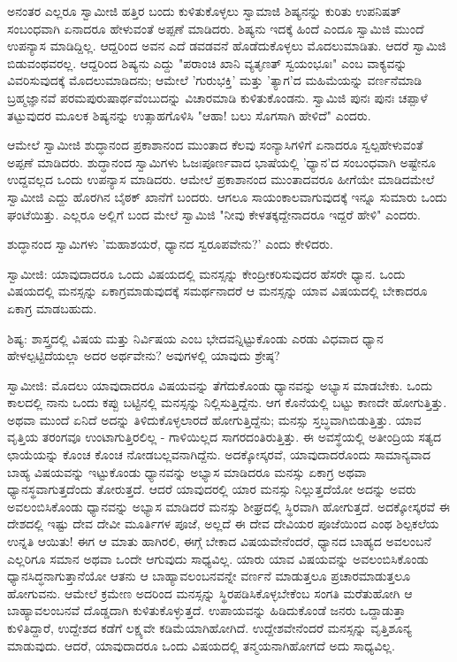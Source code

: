 ಅನಂತರ ಎಲ್ಲರೂ ಸ್ವಾಮೀಜಿ ಹತ್ತಿರ ಬಂದು ಕುಳಿತುಕೊಳ್ಳಲು ಸ್ವಾಮಾಜಿ ಶಿಷ್ಯನನ್ನು ಕುರಿತು ಉಪನಿಷತ್‌ ಸಂಬಂಧವಾಗಿ ಏನಾದರೂ ಹೇಳುವಂತೆ ಅಪ್ಪಣೆ ಮಾಡಿದರು. ಶಿಷ್ಯನು ಇದಕ್ಕೆ ಹಿಂದೆ ಎಂದೂ ಸ್ವಾಮಿಜಿ ಮುಂದೆ ಉಪನ್ಯಾಸ ಮಾಡಿದ್ದಿಲ್ಲ. ಆದ್ದರಿಂದ ಅವನ ಎದೆ ಡವಡವನೆ ಹೊಡೆದುಕೊಳ್ಳಲು ಮೊದಲುಮಾಡಿತು. ಆದರೆ ಸ್ವಾಮಿಜಿ ಬಿಡುವಂಥವರಲ್ಲ. ಆದ್ದರಿಂದ ಶಿಷ್ಯನು ಎದ್ದು "ಪರಾಂಚಿ ಖಾನಿ ವ್ಯತೃಣತ್ ಸ್ವಯಂಭೂಃ" ಎಂಬ ವಾಕ್ಯವನ್ನು ವಿವರಿಸುವುದಕ್ಕೆ ಮೊದಲುಮಾಡಿದನು; ಆಮೇಲೆ 'ಗುರುಭಕ್ತಿ' ಮತ್ತು 'ತ್ಯಾಗ'ದ ಮಹಿಮೆಯನ್ನು ವರ್ಣನೆಮಾಡಿ ಬ್ರಹ್ಮಜ್ಞಾನವೆ ಪರಮಪುರುಷಾರ್ಥವೆಂಬುದನ್ನು ವಿಚಾರಮಾಡಿ ಕುಳಿತುಕೊಂಡನು. ಸ್ವಾಮಿಜಿ ಪುನಃ ಪುನಃ ಚಪ್ಪಾಳೆ ತಟ್ಟುವುದರ ಮೂಲಕ ಶಿಷ್ಯನನ್ನು ಉತ್ಸಾಹಗೊಳಿಸಿ "ಆಹಾ! ಬಲು ಸೊಗಸಾಗಿ ಹೇಳಿದೆ" ಎಂದರು.

ಆಮೇಲೆ ಸ್ವಾಮೀಜಿ ಶುದ್ಧಾನಂದ ಪ್ರಕಾಶಾನಂದ ಮುಂತಾದ ಕೆಲವು ಸಂನ್ಯಾಸಿಗಳಿಗೆ ಏನಾದರೂ ಸ್ವಲ್ಪಹೇಳುವಂತೆ ಅಪ್ಪಣೆ ಮಾಡಿದರು. ಶುದ್ಧಾನಂದ ಸ್ವಾಮಿಗಳು ಓಜಃಪೂರ್ಣವಾದ ಭಾಷೆಯಲ್ಲಿ 'ಧ್ಯಾನ'ದ ಸಂಬಂಧವಾಗಿ ಅಷ್ಟೇನೂ ಉದ್ದವಲ್ಲದ ಒಂದು ಉಪನ್ಯಾಸ ಮಾಡಿದರು. ಆಮೇಲೆ ಪ್ರಕಾಶಾನಂದ ಮುಂತಾದವರೂ ಹೀಗೆಯೇ ಮಾಡಿದಮೇಲೆ ಸ್ವಾಮೀಜಿ ಎದ್ದು ಹೊರಗಿನ ಬೈಠಕ್ ಖಾನೆಗೆ ಬಂದರು. ಆಗಲೂ ಸಾಯಂಕಾಲವಾಗುವುದಕ್ಕೆ ಇನ್ನೂ ಸುಮಾರು ಒಂದು ಘಂಟೆಯಿತ್ತು. ಎಲ್ಲರೂ ಅಲ್ಲಿಗೆ ಬಂದ ಮೇಲೆ ಸ್ವಾಮಿಜಿ "ನೀವು ಕೇಳತಕ್ಕದ್ದೇನಾದರೂ ಇದ್ದರೆ ಹೇಳಿ" ಎಂದರು.

ಶುದ್ಧಾನಂದ ಸ್ವಾಮಿಗಳು 'ಮಹಾಶಯರೆ, ಧ್ಯಾನದ ಸ್ವರೂಪವೇನು?' ಎಂದು ಕೇಳಿದರು.

ಸ್ವಾಮೀಜಿ: ಯಾವುದಾದರೂ ಒಂದು ವಿಷಯದಲ್ಲಿ ಮನಸ್ಸನ್ನು ಕೇಂದ್ರೀಕರಿಸುವುದರ ಹೆಸರೇ ಧ್ಯಾನ. ಒಂದು ವಿಷಯದಲ್ಲಿ ಮನಸ್ಸನ್ನು ಏಕಾಗ್ರಮಾಡುವುದಕ್ಕೆ ಸಮರ್ಥನಾದರೆ ಆ ಮನಸ್ಸನ್ನು ಯಾವ ವಿಷಯದಲ್ಲಿ ಬೇಕಾದರೂ ಏಕಾಗ್ರ ಮಾಡಬಹುದು.

ಶಿಷ್ಯ: ಶಾಸ್ತ್ರದಲ್ಲಿ ವಿಷಯ ಮತ್ತು ನಿರ್ವಿಷಯ ಎಂಬ ಭೇದವನ್ನಿಟ್ಟುಕೊಂಡು ಎರಡು ವಿಧವಾದ ಧ್ಯಾನ ಹೇಳಲ್ಪಟ್ಟಿದೆಯಲ್ಲಾ ಅದರ ಅರ್ಥವೇನು? ಅವುಗಳಲ್ಲಿ ಯಾವುದು ಶ್ರೇಷ್ಠ?

ಸ್ವಾಮೀಜಿ: ಮೊದಲು ಯಾವುದಾದರೂ ವಿಷಯವನ್ನು ತೆಗೆದುಕೊಂಡು ಧ್ಯಾನವನ್ನು ಅಭ್ಯಾಸ ಮಾಡಬೇಕು. ಒಂದು ಕಾಲದಲ್ಲಿ ನಾನು ಒಂದು ಕಪ್ಪು ಬಟ್ಟಿನಲ್ಲಿ ಮನಸ್ಸನ್ನು ನಿಲ್ಲಿಸುತ್ತಿದ್ದೆನು. ಆಗ ಕೊನೆಯಲ್ಲಿ ಬಟ್ಟು ಕಾಣದೇ ಹೋಗುತ್ತಿತ್ತು. ಅಥವಾ ಮುಂದೆ ಏನಿದೆ ಅದನ್ನು ತಿಳಿದುಕೊಳ್ಳಲಾರದೆ ಹೋಗುತ್ತಿದ್ದೆನು; ಮನಸ್ಸು ಸ್ತಬ್ಧವಾಗಿಬಿಡುತ್ತಿತ್ತು. ಯಾವ ವೃತ್ತಿಯ ತರಂಗವೂ ಉಂಟಾಗುತ್ತಿರಲಿಲ್ಲ - ಗಾಳಿಯಿಲ್ಲದ ಸಾಗರದಂತಿರುತ್ತಿತ್ತು. ಈ ಅವಸ್ಥೆಯಲ್ಲಿ ಅತೀಂದ್ರಿಯ ಸತ್ಯದ ಛಾಯೆಯನ್ನು ಕೊಂಚ ಕೊಂಚ ನೋಡಬಲ್ಲವನಾಗಿದ್ದೆನು. ಅದಕ್ಕೋಸ್ಕರವೆ, ಯಾವುದಾದರೊಂದು ಸಾಮಾನ್ಯವಾದ ಬಾಹ್ಯ ವಿಷಯವನ್ನು ಇಟ್ಟುಕೊಂಡು ಧ್ಯಾನವನ್ನು ಅಭ್ಯಾಸ ಮಾಡಿದರೂ ಮನಸ್ಸು ಏಕಾಗ್ರ ಅಥವಾ ಧ್ಯಾನಸ್ಥವಾಗುತ್ತದೆಂದು ತೋರುತ್ತದೆ. ಆದರೆ ಯಾವುದರಲ್ಲಿ ಯಾರ ಮನಸ್ಸು ನಿಲ್ಲುತ್ತದೆಯೋ ಅದನ್ನು ಅವರು ಅವಲಂಬಿಸಿಕೊಂಡು ಧ್ಯಾನವನ್ನು ಅಭ್ಯಾಸ ಮಾಡಿದರೆ ಮನಸ್ಸು ಶೀಘ್ರದಲ್ಲಿ ಸ್ಥಿರವಾಗಿ ಹೋಗುತ್ತದೆ. ಅದಕ್ಕೋಸ್ಕರವೆ ಈ ದೇಶದಲ್ಲಿ ಇಷ್ಟು ದೇವ ದೇವೀ ಮೂರ್ತಿಗಳ ಪೂಜೆ, ಅಲ್ಲದೆ ಈ ದೇವ ದೇವಿಯರ ಪೂಜೆಯಿಂದ ಎಂಥ ಶಿಲ್ಪಕಲೆಯ ಉನ್ನತಿ ಆಯಿತು! ಈಗ ಆ ಮಾತು ಹಾಗಿರಲಿ, ಈಗ್ಗೆ ಬೇಕಾದ ವಿಷಯವೇನೆಂದರೆ, ಧ್ಯಾನದ ಬಾಹ್ಯದ ಅವಲಂಬನೆ ಎಲ್ಲರಿಗೂ ಸಮಾನ ಅಥವಾ ಒಂದೇ ಆಗುವುದು ಸಾಧ್ಯವಿಲ್ಲ. ಯಾರು ಯಾವ ವಿಷಯವನ್ನು ಅವಲಂಬಿಸಿಕೊಂಡು ಧ್ಯಾನಸಿದ್ಧನಾಗುತ್ತಾನೆಯೋ ಆತನು ಆ ಬಾಹ್ಯಾವಲಂಬನವನ್ನೇ ವರ್ಣನೆ ಮಾಡುತ್ತಲೂ ಪ್ರಚಾರಮಾಡುತ್ತಲೂ ಹೋಗುವನು. ಆಮೇಲೆ ಕ್ರಮೇಣ ಅದರಿಂದ ಮನಸ್ಸನ್ನು ಸ್ಥಿರಪಡಿಸಿಕೊಳ್ಳಬೇಕೆಂಬ ಸಂಗತಿ ಮರೆತುಹೋಗಿ ಆ ಬಾಹ್ಯಾವಲಂಬನವೆ ದೊಡ್ಡದಾಗಿ ಕುಳಿತುಕೊಳ್ಳುತ್ತದೆ. ಉಪಾಯವನ್ನು ಹಿಡಿದುಕೊಂಡೆ ಜನರು ಒದ್ದಾಡುತ್ತಾ ಕುಳಿತಿದ್ದಾರೆ, ಉದ್ದೇಶದ ಕಡೆಗೆ ಲಕ್ಷ್ಯವೇ ಕಡಿಮೆಯಾಗಿಹೋಗಿದೆ. ಉದ್ದೇಶವೇನೆಂದರೆ ಮನಸ್ಸನ್ನು ವೃತ್ತಿಶೂನ್ಯ ಮಾಡುವುದು. ಆದರೆ, ಯಾವುದಾದರೂ ಒಂದು ವಿಷಯದಲ್ಲಿ ತನ್ಮಯನಾಗಿಹೋಗದೆ ಅದು ಸಾಧ್ಯವಿಲ್ಲ.

